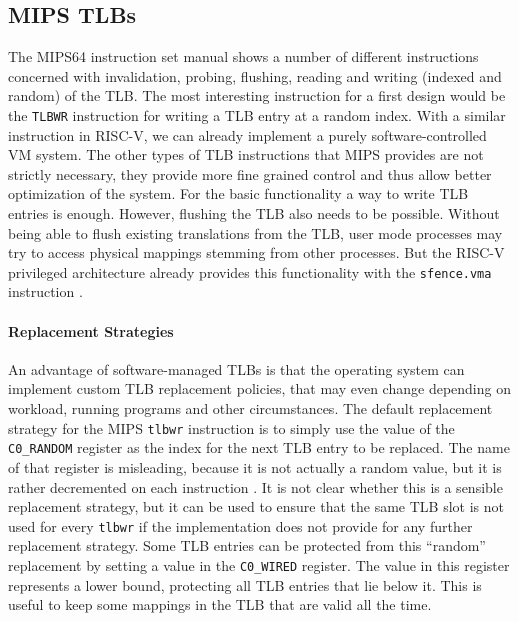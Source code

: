 \subsection{MIPS TLBs}               %


The MIPS64 instruction set manual \cite{MIPSArchitectureProgrammers2016}
shows a number of different instructions concerned with invalidation, probing, flushing, reading
and writing (indexed and random) of the TLB.
The most interesting instruction for a first design would be the \texttt{TLBWR} instruction for writing a TLB
entry at a random index. With a similar instruction in RISC-V, we can already implement a purely
software-controlled VM system.
The other types of TLB instructions that MIPS provides are not strictly necessary, they provide more fine grained control and thus allow better optimization of the system. For the basic functionality a way to write TLB entries is enough. However, flushing the TLB also needs to be possible. Without being able to flush existing translations from the TLB,
user mode processes may try to access physical mappings stemming from other processes. But the RISC-V privileged architecture already provides this functionality
with the \texttt{sfence.vma} instruction \cite{riscvreader}.


\paragraph{Replacement Strategies} An advantage of software-managed TLBs is that the operating system can implement custom
TLB replacement policies, that may even change depending on workload, running programs
and other circumstances.
The default replacement strategy for the MIPS \texttt{tlbwr} instruction is to simply
use the value of the \texttt{C0\_RANDOM} register as the index for the next TLB entry
to be replaced. The name of that register is misleading, because it is not actually a
random value, but it is rather decremented on each instruction \cite{heiserAnatomyHighPerformanceMicrokernel}.
It is not clear whether this is a sensible replacement strategy,
but it can be used to ensure that the same TLB slot is not used for every \texttt{tlbwr} if the implementation
does not provide for any further replacement strategy.
Some TLB entries can be protected from this ``random'' replacement by setting a value in the \texttt{C0\_WIRED}
register. The value in this register represents a lower bound, protecting all TLB entries that lie below it.
This is useful to keep some mappings in the TLB that are valid all the time.


